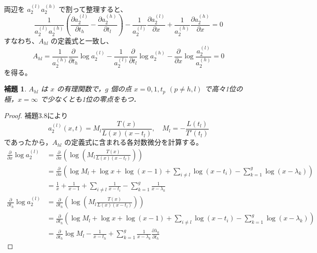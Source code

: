 \documentclass[paper=a4, fontsize=11pt]{jlreq} %
\newenvironment{story}{%
  \begin{mdframed}[
    backgroundcolor=red!5, %
    linewidth=0pt,         %
    innertopmargin=10pt,   %
    innerbottommargin=10pt,
    innerrightmargin=10pt, %
    innerleftmargin=10pt
  ]%
}{%
  \end{mdframed}%
}
\theoremstyle{break}
\newtheorem{lemma}[theorem]{補題}
\theoremstyle{qa}
\begin{document}
両辺を $a_2^{(l)} a_2^{(h)}$ で割って整理すると、
\begin{equation*}
    \frac{1}{a_2^{(l)}a_2^{(h)}} \left( \frac{\partial a_2^{(l)}}{\partial t_h} - \frac{\partial a_2^{(h)}}{\partial t_l} \right) - \frac{1}{a_2^{(l)}} \frac{\partial a_2^{(l)}}{\partial x} + \frac{1}{a_2^{(h)}} \frac{\partial a_2^{(h)}}{\partial x} = 0
\end{equation*}
すなわち、$A_{hl}$ の定義式と一致し、
\begin{equation}
    A_{hl} = \frac{1}{a_2^{(h)}} \frac{\partial}{\partial t_h} \log a_2^{(l)} - \frac{1}{a_2^{(l)}} \frac{\partial}{\partial t_l} \log a_2^{(h)} - \frac{\partial}{\partial x} \log \frac{a_2^{(l)}}{a_2^{(h)}} = 0 \label{eq:A_hl_def}
\end{equation}
を得る。

\begin{story}

\begin{lemma}
    $A_{hl}$ は $x$ の有理関数で，$g$ 個の点 $x=0, 1, t_p$ $(p \neq h, l)$ で高々1位の極，$x=\infty$ で少なくとも1位の零点をもつ．
\end{lemma}

\begin{proof}
    補題3.8により
    \begin{equation*}
        a_2^{(l)}(x,t) = M_l \frac{T(x)}{L(x)(x-t_l)}, \quad M_l = -\frac{L(t_l)}{T'(t_l)}
    \end{equation*}
    であったから，$A_{hl}$ の定義式に含まれる各対数微分を計算する。
\begin{align*}
    \frac{\partial}{\partial x} \log a_2^{(l)} &= \frac{\partial}{\partial x} \left( \log \left( M_l \frac{T(x)}{L(x)(x-t_l)} \right) \right) \\
    &= \frac{\partial}{\partial x} \left( \log M_l + \log x + \log(x-1) + \sum_{i \neq l} \log(x-t_i) - \sum_{k=1}^g \log(x-\lambda_k) \right) \\
    &= \frac{1}{x} + \frac{1}{x-1} + \sum_{i \neq l} \frac{1}{x-t_i} - \sum_{k=1}^g \frac{1}{x-\lambda_k} \\[8pt]
    \frac{\partial}{\partial t_h} \log a_2^{(l)} &= \frac{\partial}{\partial t_h} \left( \log \left( M_l \frac{T(x)}{L(x)(x-t_l)} \right) \right) \\
    &= \frac{\partial}{\partial t_h} \left( \log M_l + \log x + \log(x-1) + \sum_{i \neq l} \log(x-t_i) - \sum_{k=1}^g \log(x-\lambda_k) \right) \\
    &= \frac{\partial}{\partial t_h} \log M_l - \frac{1}{x-t_h} + \sum_{k=1}^g \frac{1}{x-\lambda_k} \frac{\partial \lambda_k}{\partial t_h}
\end{align*}


\end{proof}
\end{story}
\end{document}
